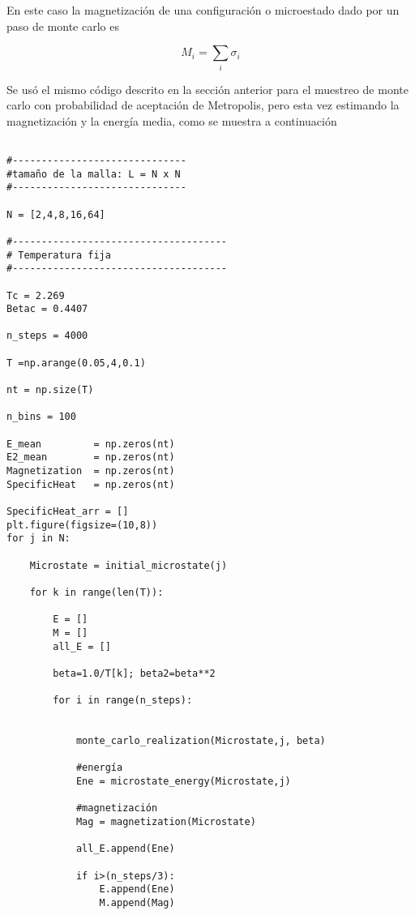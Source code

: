 \documentclass[a4paper,12pt]{article}
\begin{document}
\noindent En este caso la magnetización de una configuración o microestado dado por un paso de monte carlo es

\begin{equation}
  M_{i} = \sum_{i} \sigma_{i}
\end{equation}

\noindent Se usó el mismo código descrito en la sección anterior para el muestreo de monte carlo con probabilidad de aceptación de Metropolis, pero esta vez estimando la magnetización y la energía media, como se muestra a continuación

\begin{verbatim}
         
#------------------------------
#tamaño de la malla: L = N x N
#------------------------------

N = [2,4,8,16,64]      

#-------------------------------------
# Temperatura fija
#-------------------------------------

Tc = 2.269
Betac = 0.4407

n_steps = 4000

T =np.arange(0.05,4,0.1)

nt = np.size(T)

n_bins = 100

E_mean         = np.zeros(nt)
E2_mean        = np.zeros(nt)
Magnetization  = np.zeros(nt)
SpecificHeat   = np.zeros(nt)

SpecificHeat_arr = []
plt.figure(figsize=(10,8))
for j in N:
    
    Microstate = initial_microstate(j)
    
    for k in range(len(T)):

        E = []
        M = []
        all_E = []
    
        beta=1.0/T[k]; beta2=beta**2

        for i in range(n_steps):

        
            monte_carlo_realization(Microstate,j, beta)
        
            #energía
            Ene = microstate_energy(Microstate,j)
        
            #magnetización
            Mag = magnetization(Microstate) 

            all_E.append(Ene)
            
            if i>(n_steps/3):
                E.append(Ene)
                M.append(Mag)
                

\end{verbatim}
\end{document}
